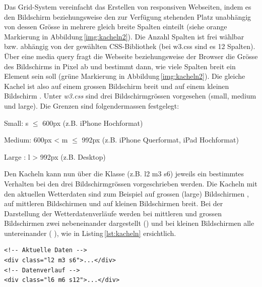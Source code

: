 \noindent
Das Grid-System vereinfacht das Erstellen von responsiven Webseiten, indem es den Bildschirm beziehungsweise den zur Verfügung stehenden Platz unabhängig von dessen Grösse in mehrere gleich breite Spalten einteilt (siehe orange Markierung in Abbildung\,\ref{img:kacheln2}). Die Anzahl Spalten ist frei wählbar bzw. abhängig von der gewählten CSS-Bibliothek (bei w3.css sind es 12 Spalten). Über eine media query fragt die Webseite beziehungsweise der Browser die Grösse des Bildschirms in Pixel ab und bestimmt dann, wie viele Spalten breit ein Element sein soll (grüne Markierung in Abbildung\,\ref{img:kacheln2}). Die gleiche Kachel ist also auf einem grossen Bildschirm   breit und auf einem kleinen Bildschirm . Unter \emph{w3.css} sind drei Bildschirmgrössen vorgesehen (small, medium und large). Die Grenzen sind folgendermassen festgelegt:

\begin{description*}
  \item [Small:] s $\leq$ 600px (z.B. iPhone Hochformat)
  \item [Medium:] 600px < m $\leq$ 992px (z.B. iPhone Querformat, iPad Hochformat)
  \item [Large]: l > 992px (z.B. Desktop)
\end{description*}

\noindent
Den Kacheln kann nun über die Klasse (z.B. l2 m3 s6) jeweils ein bestimmtes Verhalten bei den drei Bildschirmgrössen vorgeschrieben werden. Die Kacheln mit den aktuellen Wetterdaten sind zum Beispiel auf grossen (large) Bildschirmen , auf mittleren Bildschirmen  und auf kleinen Bildschirmen  breit. Bei der Darstellung der Wetterdatenverläufe werden bei mittleren und grossen Bildschirmen zwei nebeneinander dargestellt () und bei kleinen Bildschirmen alle untereinander ( ), wie in Listing\,\ref{lst:kacheln} ersichtlich.

\vspace{3mm}
\begin{lstlisting}[label=lst:kacheln,caption=Konfiguration der Anzahl Kacheln abhängig von der Bildschirmgrösse, language=HTML5, style=htmlcssjs]
<!-- Aktuelle Daten -->
<div class="l2 m3 s6">...</div>
<!-- Datenverlauf -->
<div class="l6 m6 s12">...</div>
\end{lstlisting}
\vspace{3mm}

